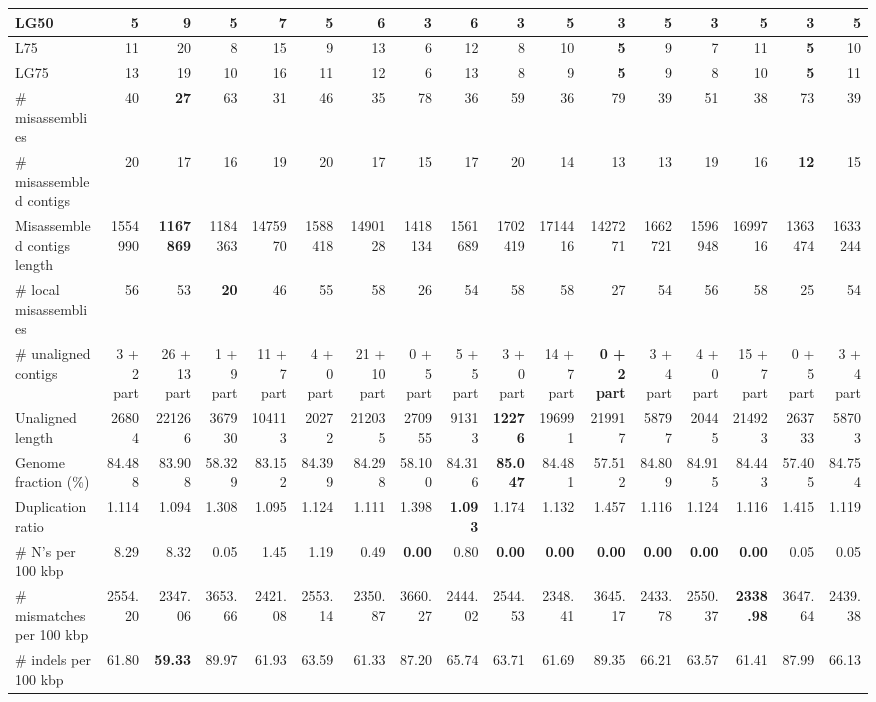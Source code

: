 \documentclass[12pt,a4paper]{article}
\begin{document}
\begin{table}[ht]
\begin{center}
\begin{tabular}{|l*{16}{|r}|}
LG50 & 5 & 9 & 5 & 7 & 5 & 6 & {\bf 3} & 6 & {\bf 3} & 5 & {\bf 3} & 5 & {\bf 3} & 5 & {\bf 3} & 5 \\ \hline
L75 & 11 & 20 & 8 & 15 & 9 & 13 & 6 & 12 & 8 & 10 & {\bf 5} & 9 & 7 & 11 & {\bf 5} & 10 \\ \hline
LG75 & 13 & 19 & 10 & 16 & 11 & 12 & 6 & 13 & 8 & 9 & {\bf 5} & 9 & 8 & 10 & {\bf 5} & 11 \\ \hline
\# misassemblies & 40 & {\bf 27} & 63 & 31 & 46 & 35 & 78 & 36 & 59 & 36 & 79 & 39 & 51 & 38 & 73 & 39 \\ \hline
\# misassembled contigs & 20 & 17 & 16 & 19 & 20 & 17 & 15 & 17 & 20 & 14 & 13 & 13 & 19 & 16 & {\bf 12} & 15 \\ \hline
Misassembled contigs length & 1554990 & {\bf 1167869} & 1184363 & 1475970 & 1588418 & 1490128 & 1418134 & 1561689 & 1702419 & 1714416 & 1427271 & 1662721 & 1596948 & 1699716 & 1363474 & 1633244 \\ \hline
\# local misassemblies & 56 & 53 & {\bf 20} & 46 & 55 & 58 & 26 & 54 & 58 & 58 & 27 & 54 & 56 & 58 & 25 & 54 \\ \hline
\# unaligned contigs & 3 + 2 part & 26 + 13 part & 1 + 9 part & 11 + 7 part & 4 + 0 part & 21 + 10 part & 0 + 5 part & 5 + 5 part & 3 + 0 part & 14 + 7 part & {\bf 0 + 2 part} & 3 + 4 part & 4 + 0 part & 15 + 7 part & 0 + 5 part & 3 + 4 part \\ \hline
Unaligned length & 26804 & 221266 & 367930 & 104113 & 20272 & 212035 & 270955 & 91313 & {\bf 12276} & 196991 & 219917 & 58797 & 20445 & 214923 & 263733 & 58703 \\ \hline
Genome fraction (\%) & 84.488 & 83.908 & 58.329 & 83.152 & 84.399 & 84.298 & 58.100 & 84.316 & {\bf 85.047} & 84.481 & 57.512 & 84.809 & 84.915 & 84.443 & 57.405 & 84.754 \\ \hline
Duplication ratio & 1.114 & 1.094 & 1.308 & 1.095 & 1.124 & 1.111 & 1.398 & {\bf 1.093} & 1.174 & 1.132 & 1.457 & 1.116 & 1.124 & 1.116 & 1.415 & 1.119 \\ \hline
\# N's per 100 kbp & 8.29 & 8.32 & 0.05 & 1.45 & 1.19 & 0.49 & {\bf 0.00} & 0.80 & {\bf 0.00} & {\bf 0.00} & {\bf 0.00} & {\bf 0.00} & {\bf 0.00} & {\bf 0.00} & 0.05 & 0.05 \\ \hline
\# mismatches per 100 kbp & 2554.20 & 2347.06 & 3653.66 & 2421.08 & 2553.14 & 2350.87 & 3660.27 & 2444.02 & 2544.53 & 2348.41 & 3645.17 & 2433.78 & 2550.37 & {\bf 2338.98} & 3647.64 & 2439.38 \\ \hline
\# indels per 100 kbp & 61.80 & {\bf 59.33} & 89.97 & 61.93 & 63.59 & 61.33 & 87.20 & 65.74 & 63.71 & 61.69 & 89.35 & 66.21 & 63.57 & 61.41 & 87.99 & 66.13 \\ \hline

\end{tabular}
\end{center}
\end{table}
\end{document}
